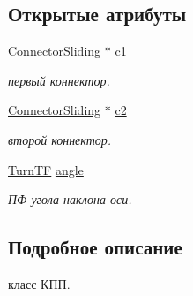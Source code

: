 \subsection*{Открытые атрибуты}
\begin{DoxyCompactItemize}
\item 
\hypertarget{class_k_p_sliding_ad6bc7cae8c3b668341911454f17c9a0d}{
\hyperlink{struct_connector_sliding}{ConnectorSliding} $\ast$ \hyperlink{class_k_p_sliding_ad6bc7cae8c3b668341911454f17c9a0d}{c1}}
\label{class_k_p_sliding_ad6bc7cae8c3b668341911454f17c9a0d}

\begin{DoxyCompactList}\small\item\em первый коннектор. \item\end{DoxyCompactList}\item 
\hypertarget{class_k_p_sliding_a6f65155b81a19bc4e21a3dd4dee6e6db}{
\hyperlink{struct_connector_sliding}{ConnectorSliding} $\ast$ \hyperlink{class_k_p_sliding_a6f65155b81a19bc4e21a3dd4dee6e6db}{c2}}
\label{class_k_p_sliding_a6f65155b81a19bc4e21a3dd4dee6e6db}

\begin{DoxyCompactList}\small\item\em второй коннектор. \item\end{DoxyCompactList}\item 
\hypertarget{class_k_p_sliding_a01e5013755146095c0607ed7ae2e7f1d}{
\hyperlink{struct_turn_t_f}{TurnTF} \hyperlink{class_k_p_sliding_a01e5013755146095c0607ed7ae2e7f1d}{angle}}
\label{class_k_p_sliding_a01e5013755146095c0607ed7ae2e7f1d}

\begin{DoxyCompactList}\small\item\em ПФ угола наклона оси. \item\end{DoxyCompactList}\end{DoxyCompactItemize}


\subsection{Подробное описание}
класс КПП. 

